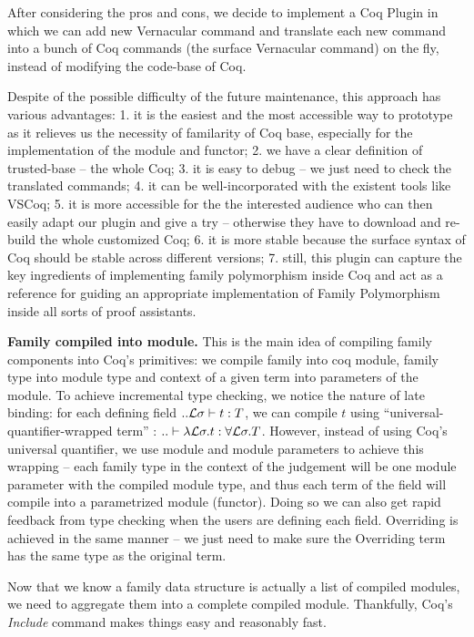 After considering the pros and cons, we decide to implement a Coq Plugin in which we can add new Vernacular command and translate each new command into a bunch of Coq commands (the surface Vernacular command) on the fly, instead of modifying the code-base of Coq. 

Despite of the possible difficulty of the future maintenance, this approach has various advantages: 1. it is the easiest and the most accessible way to prototype as it relieves us the necessity of familarity of Coq base, especially for the implementation of the module and functor; 2. we have a clear definition of trusted-base -- the whole Coq; 3. it is easy to debug -- we just need to check the translated commands; 4. it can be well-incorporated with the existent tools like VSCoq; 5. it is more accessible for the the interested audience who can then easily adapt our plugin and give a try -- otherwise they have to download and re-build the whole customized Coq; 6. it is more stable because the surface syntax of Coq should be stable across different versions; 7. still, this plugin can capture the key ingredients of implementing family polymorphism inside Coq and act as a reference for guiding an appropriate implementation of Family Polymorphism inside all sorts of proof assistants.

\textbf{Family compiled into module.} This is the main idea of compiling family components into Coq's primitives: we compile family into coq module, family type into module type and context of a given term into parameters of the module. To achieve incremental type checking, we notice the nature of late binding: for each defining field $ .. {\mathcal{L}}\sigma \vdash t : T $, we can compile $t$ using ``universal-quantifier-wrapped term'' : $.. \vdash \lambda {\mathcal{L}} \sigma. t : \forall {\mathcal{L}} \sigma. T$. However, instead of using Coq's universal quantifier, we use module and module parameters to achieve this wrapping -- each family type in the context of the judgement will be one module parameter with the compiled module type, and thus each term of the field will compile into a parametrized module (functor). Doing so we can also get rapid feedback from type checking when the users are defining each field. Overriding is achieved in the same manner -- we just need to make sure the Overriding term has the same type as the original term. 


Now that we know a family data structure is actually a list of compiled modules, we need to aggregate them into a complete compiled module. Thankfully, Coq's \textit{Include} command makes things easy and reasonably fast.  

